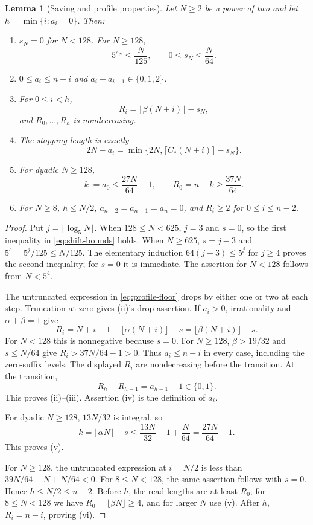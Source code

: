 \documentclass[11pt]{article}
\newtheorem{lemma}[theorem]{Lemma}
\theoremstyle{definition}
\theoremstyle{remark}
\begin{document}
\begin{lemma}[Saving and profile properties]\label{lem:profile}
Let $N\ge2$ be a power of two and let $h=\min\{i:a_i=0\}$. Then:
\begin{enumerate}[label=\textup{(\roman*)}]
\item $s_N=0$ for $N<128$. For $N\ge128$,
\begin{equation}\label{eq:shift-bounds}
 5^{s_N}\le\frac N{125},\qquad 0\le s_N\le\frac N{64}.
\end{equation}
\item $0\le a_i\le n-i$ and $a_i-a_{i+1}\in\{0,1,2\}$.
\item For $0\le i<h$,
\begin{equation}\label{eq:R-beta}
 R_i=\lfloor\beta(N+i)\rfloor-s_N,
\end{equation}
and $R_0,\ldots,R_h$ is nondecreasing.
\item The stopping length is exactly
\begin{equation}\label{eq:profile-stop}
 2N-a_i=\min\{2N,\lceil C_*(N+i)\rceil-s_N\}.
\end{equation}
\item For dyadic $N\ge128$,
\begin{equation}\label{eq:kR-bounds}
 k:=a_0\le\frac{27N}{64}-1,\qquad
 R_0=n-k\ge\frac{37N}{64}.
\end{equation}
\item For $N\ge8$, $h\le N/2$, $a_{n-2}=a_{n-1}=a_n=0$, and
$R_i\ge2$ for $0\le i\le n-2$.
\end{enumerate}
\end{lemma}
\begin{proof}
Put $j=\lfloor\log_5N\rfloor$. When $128\le N<625$, $j=3$ and $s=0$,
so the first inequality in \eqref{eq:shift-bounds} holds. When $N\ge625$,
$s=j-3$ and $5^s=5^j/125\le N/125$. The elementary induction
$64(j-3)\le5^j$ for $j\ge4$ proves the second inequality; for $s=0$
it is immediate. The assertion for $N<128$ follows from $N<5^4$.

The untruncated expression in \eqref{eq:profile-floor} drops by either one
or two at each step. Truncation at zero gives (ii)'s drop assertion.
If $a_i>0$, irrationality and $\alpha+\beta=1$ give
\[
 R_i=N+i-1-\lfloor\alpha(N+i)\rfloor-s
     =\lfloor\beta(N+i)\rfloor-s.
\]
For $N<128$ this is nonnegative because $s=0$. For $N\ge128$,
$\beta>19/32$ and $s\le N/64$ give
$R_i>37N/64-1>0$. Thus $a_i\le n-i$ in every case, including the
zero-suffix levels. The displayed $R_i$ are nondecreasing before the
transition. At the transition,
\[
 R_h-R_{h-1}=a_{h-1}-1\in\{0,1\}.
\]
This proves (ii)--(iii). Assertion (iv) is the definition of $a_i$.

For dyadic $N\ge128$, $13N/32$ is integral, so
\[
 k=\lfloor\alpha N\rfloor+s
 \le\frac{13N}{32}-1+\frac N{64}
 =\frac{27N}{64}-1.
\]
This proves (v).

For $N\ge128$, the untruncated expression at $i=N/2$ is less than
$39N/64-N+N/64<0$. For $8\le N<128$, the same assertion follows with
$s=0$. Hence $h\le N/2\le n-2$. Before $h$, the read lengths are at
least $R_0$; for $8\le N<128$ we have $R_0=\lfloor\beta N\rfloor\ge4$,
and for larger $N$ use (v). After $h$, $R_i=n-i$, proving (vi).
\end{proof}
\end{document}
